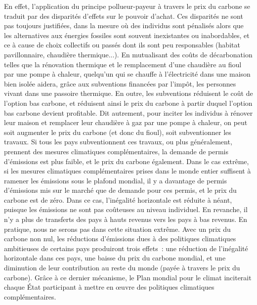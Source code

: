 \documentclass[a5paper,french]{memoir}
\begin{document}
En effet, l'application du principe pollueur-payeur à travers le prix du carbone se traduit par des disparités d'effets sur le pouvoir d'achat. %
Ces disparités ne sont pas toujours justifiées, dans la mesure où des individus sont pénalisés alors que les alternatives aux énergies fossiles sont souvent inexistantes ou inabordables, et ce à cause de choix collectifs ou passés dont ils sont peu responsables (habitat pavillonnaire, chaudière thermique...). En mutualisant des coûts de décarbonation telles que la rénovation thermique et le remplacement d'une chaudière au fioul par une pompe à chaleur, quelqu'un qui se chauffe à l'électricité dans une maison bien isolée aidera, grâce aux subventions financées par l'impôt, les personnes vivant dans une passoire thermique. En outre, les subventions réduisent le coût de l'option bas carbone, et réduisent ainsi le prix du carbone à partir duquel l'option bas carbone devient profitable. Dit autrement, pour inciter les individus à rénover leur maison et remplacer leur chaudière à gaz par une pompe à chaleur, on peut soit augmenter le prix du carbone (et donc du fioul), soit subventionner les travaux. 
Si tous les pays subventionnent ces travaux, ou plus généralement, prennent des mesures climatiques complémentaires, la demande de permis d'émissions est plus faible, et le prix du carbone également. Dans le cas extrême, si les mesures climatiques complémentaires prises dans le monde entier suffisent à ramener les émissions sous le plafond mondial, il y a davantage de permis d'émissions mis sur le marché que de demande pour ces permis, et le prix du carbone est de zéro. Dans ce cas, l'inégalité horizontale est réduite à néant, puisque les émissions ne sont pas coûteuses au niveau individuel. En revanche, il n'y a plus de transferts des pays à hauts revenus vers les pays à bas revenus. En pratique, nous ne serons pas dans cette situation extrême. Avec un prix du carbone non nul, les réductions d'émissions dues à des politiques climatiques ambitieuses de certains pays produiront trois effets~: une réduction de l'inégalité horizontale dans ces pays, une baisse du prix du carbone mondial, et une diminution de leur contribution au reste du monde (payée à travers le prix du carbone). Grâce à ce dernier mécanisme, le Plan mondial pour le climat inciterait chaque État participant à mettre en œuvre des politiques climatiques complémentaires. 
\end{document}
